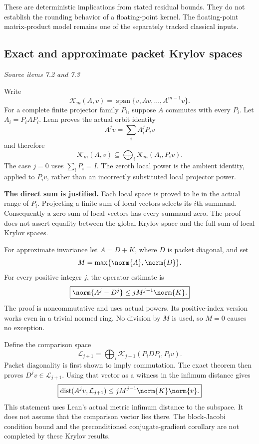 These are deterministic implications from stated residual bounds. They do not establish the rounding behavior of a floating-point kernel. The floating-point matrix-product model remains one of the separately tracked classical inputs.



\subsection{Exact and approximate packet Krylov spaces}\label{supp3:subsection:003}\textit{Source items 7.2 and 7.3}\par
Write
\[
\mathcal K_m(A,v)=\operatorname{span}\{v,Av,\ldots,A^{m-1}v\}.
\]
For a complete finite projector family $P_i$, suppose $A$ commutes with every $P_i$. Let $A_i=P_iAP_i$. Lean proves the actual orbit identity
\[
A^jv=\sum_i A_i^jP_iv
\]
and therefore
\[
\boxed{\mathcal K_m(A,v)\subseteq
\bigoplus_i\mathcal K_m(A_i,P_iv).}
\]
The case $j=0$ uses $\sum_iP_i=I$. The zeroth local power is the ambient identity, applied to $P_iv$, rather than an incorrectly substituted local projector power.

\textbf{The direct sum is justified.} Each local space is proved to lie in the actual range of $P_i$. Projecting a finite sum of local vectors selects its $i$th summand. Consequently a zero sum of local vectors has every summand zero. The proof does not assert equality between the global Krylov space and the full sum of local Krylov spaces.

For approximate invariance let $A=D+K$, where $D$ is packet diagonal, and set
\[
M=\max\{\norm{A},\norm{D}\}.
\]
For every positive integer $j$, the operator estimate is
\[
\boxed{\norm{A^j-D^j}\leq jM^{j-1}\norm{K}.}
\]
The proof is noncommutative and uses actual powers. Its positive-index version works even in a trivial normed ring. No division by $M$ is used, so $M=0$ causes no exception.

Define the comparison space
\[
\mathcal L_{j+1}=\bigoplus_i\mathcal K_{j+1}(P_iDP_i,P_iv).
\]
Packet diagonality is first shown to imply commutation. The exact theorem then proves $D^jv\in\mathcal L_{j+1}$. Using that vector as a witness in the infimum distance gives
\[
\boxed{\operatorname{dist}(A^jv,\mathcal L_{j+1})
\leq jM^{j-1}\norm{K}\norm{v}.}
\]
This statement uses Lean's actual metric infimum distance to the subspace. It does not assume that the comparison vector lies there. The block-Jacobi condition bound and the preconditioned conjugate-gradient corollary are not completed by these Krylov results.



